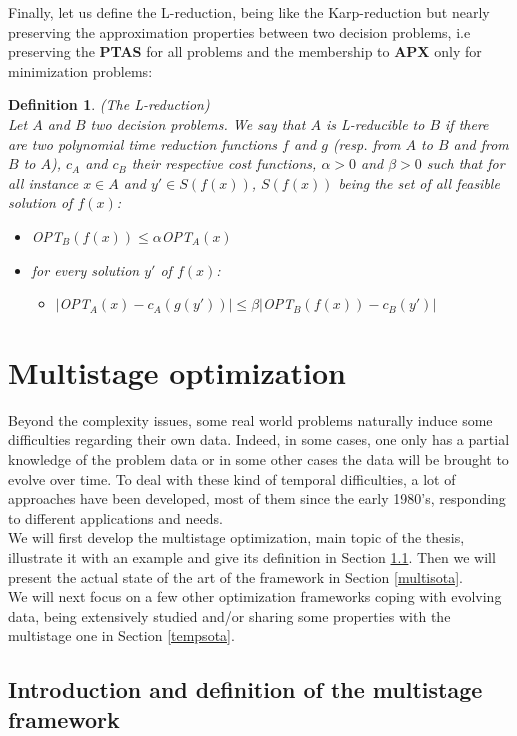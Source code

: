 \documentclass[a4paper]{book}
\newtheorem{definition}{Definition}
\begin{document}
Finally, let us define the L-reduction, being like the Karp-reduction but nearly preserving the approximation properties between two decision problems, i.e preserving the \textbf{PTAS} for all problems and the membership to \textbf{APX} only for minimization problems:
\begin{definition}{\emph{(The L-reduction)}}\\
Let $A$ and $B$ two decision problems. We say that $A$ is L-reducible to $B$ if there are two polynomial time reduction functions $f$ and $g$ (resp. from $A$ to $B$ and from $B$ to $A$), $c_A$ and $c_B$ their respective cost functions, $\alpha >0$ and $\beta >0 $ such that for all instance $x \in A$ and $y' \in S(f(x))$, $S(f(x))$ being the set of all feasible solution of $f(x)$:
\begin{itemize}
    \item OPT$_B(f(x))\leq \alpha $OPT$_A(x)$
    \item for every solution $y'$ of $f(x)$: 
    \begin{itemize}
        \item $|$OPT$_A(x)-c_A(g(y'))|\leq \beta|$OPT$_B(f(x))-c_B(y')|$
    \end{itemize}
\end{itemize}
\end{definition}

\section{Multistage optimization}
Beyond the complexity issues, some real world problems naturally induce some difficulties regarding their own data. Indeed, in some cases, one only has a partial knowledge of the problem data or in some other cases the data will be brought to evolve over time. To deal with these kind of temporal difficulties, a lot of approaches have been developed, most of them since the early 1980's, responding to different applications and needs. \\
We will first develop the multistage optimization, main topic of the thesis, illustrate it with an example and give its definition in Section \ref{multiintro}. Then we will present the actual state of the art of the framework in Section \ref{multisota}. \\
We will next focus on a few other optimization frameworks coping with evolving data, being extensively studied and/or sharing some properties with the multistage one in Section \ref{tempsota}. 
\subsection{Introduction and definition of the multistage framework}\label{multiintro}
\end{document}
